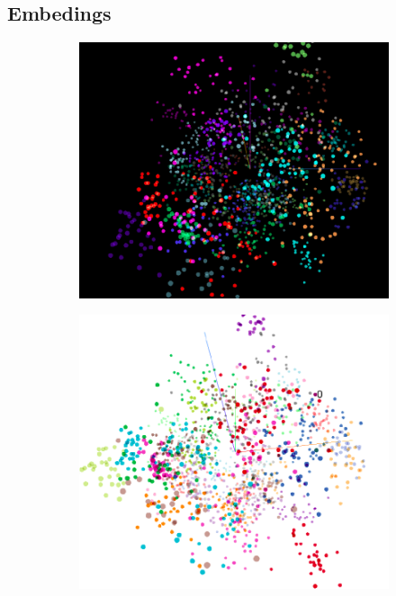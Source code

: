 \documentclass[journal, twocolumn]{IEEEtran}
\begin{document}
\subsection{Embedings} 
\begin{figure}[h!]
  \centering
  \begin{subfigure}[b]{0.5\linewidth}
    \includegraphics[width=\linewidth]{img/pca1.png}
    \caption{}
  \end{subfigure}
  \begin{subfigure}[b]{0.5\linewidth}
    \includegraphics[width=\linewidth]{img/pca2.png}

\end{subfigure}
\end{figure}
\end{document}

